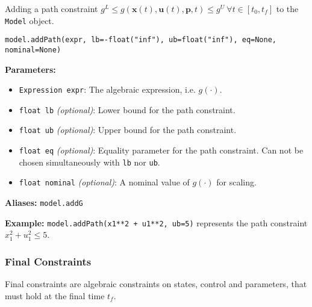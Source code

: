 \documentclass[12pt]{article}
\renewcommand{\v}{\bm}
\begin{document}
\begin{mdframed}[backgroundcolor=gray!10, roundcorner=10pt,
		linewidth=1pt]

	Adding a path constraint ${g}^{L} \leq {g}(\v{x}(t), \v{u}(t),
		\v{p}, t) \leq {g}^{U}\ \forall t \in [t_0, t_f]$ to the
	\texttt{Model} object.

	\begin{lstlisting}
model.addPath(expr, lb=-float("inf"), ub=float("inf"), eq=None, nominal=None)
		\end{lstlisting}
	\label{addPath}
	\textbf{Parameters:}
	\begin{itemize}
		\item \texttt{Expression expr}: The algebraic
		      expression, i.e. $g(\cdot)$.
		\item \texttt{float lb} \emph{(optional)}: Lower bound
		      for the path constraint.
		\item \texttt{float ub} \emph{(optional)}: Upper bound
		      for the path constraint.
		\item \texttt{float eq} \emph{(optional)}: Equality
		      parameter for the path constraint. Can not be chosen
		      simultaneously with
		      \texttt{lb} nor \texttt{ub}.
		\item \texttt{float nominal} \emph{(optional)}: A
		      nominal value of $g(\cdot)$ for scaling.
	\end{itemize}

	\textbf{Aliases:}  \texttt{model.addG}

	\textbf{Example:} \texttt{model.addPath(x1**2 + u1**2, ub=5)}
	represents the path constraint
	$x_1^2 + u_1^2 \leq 5$.
\end{mdframed}

\subsubsection{Final Constraints}

Final constraints are algebraic constraints on states, control and
parameters, that must hold at the final time $t_f$.
\end{document}

